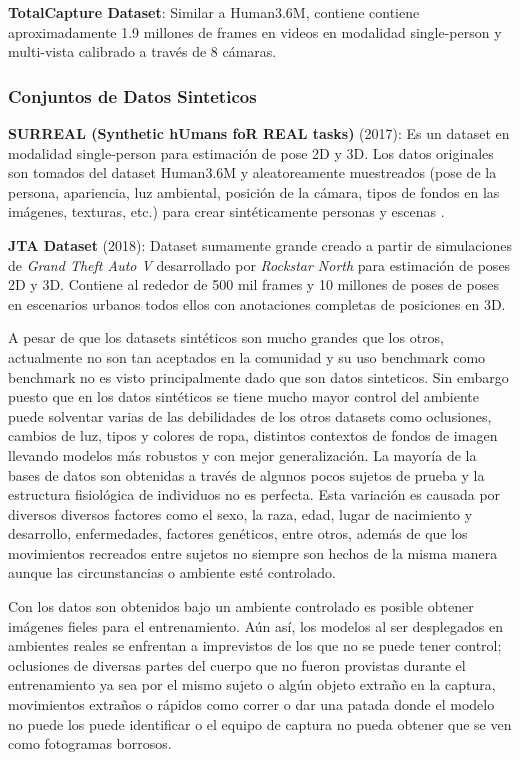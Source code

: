 \textbf{TotalCapture Dataset}: Similar a Human3.6M, contiene contiene aproximadamente 1.9 millones
de frames en videos en modalidad single-person y multi-vista calibrado a través de 8 cámaras.

\subsubsection{Conjuntos de Datos Sinteticos}

\textbf{SURREAL (Synthetic hUmans foR REAL tasks)} (2017): Es un dataset en modalidad single-person para
estimación de pose 2D y 3D. Los datos originales son tomados del dataset Human3.6M y aleatoreamente
muestreados (pose de la persona, apariencia, luz ambiental, posición de la cámara, tipos de fondos
en las imágenes, texturas, etc.) para crear sintéticamente personas y escenas
\cite{DBLP:journals/corr/Varol0MMBLS17}.

\textbf{JTA Dataset} (2018): Dataset sumamente grande creado a partir de simulaciones de
\textit{Grand Theft Auto V} desarrollado por \textit{Rockstar North} \cite{fabbri2018learning}
para estimación de poses 2D y 3D. Contiene al
rededor de 500 mil frames y 10 millones de poses de poses en escenarios urbanos todos ellos con
anotaciones completas de posiciones en 3D.

A pesar de que los datasets sintéticos son mucho grandes que los otros, actualmente no son tan
aceptados en la comunidad y su uso benchmark como benchmark no es visto principalmente dado que son
datos sinteticos. Sin embargo puesto que en los datos sintéticos se tiene mucho mayor control
del ambiente puede solventar varias de las debilidades de los otros datasets como oclusiones, cambios
de luz, tipos y colores de ropa, distintos contextos de fondos de imagen llevando modelos más robustos
y con mejor generalización. La mayoría de la bases de datos son obtenidas a través de algunos pocos
sujetos de prueba y la estructura fisiológica de individuos no es perfecta. Esta variación es causada
por diversos diversos factores como el sexo, la raza, edad, lugar de nacimiento y desarrollo,
enfermedades, factores genéticos, entre otros, además de que los movimientos recreados entre sujetos
no siempre son hechos de la misma manera aunque las circunstancias o ambiente esté controlado.

Con los datos son obtenidos bajo un ambiente controlado es posible obtener imágenes fieles para el
entrenamiento. Aún así, los modelos al ser desplegados en ambientes reales
se enfrentan a imprevistos de los que no se puede tener control; oclusiones de diversas partes del
cuerpo que no fueron provistas durante el entrenamiento ya sea por el mismo sujeto o algún objeto
extraño en la captura, movimientos extraños o rápidos como correr o dar una patada donde el modelo
no puede los puede identificar o el equipo de captura no pueda obtener que se ven como fotogramas
borrosos.

